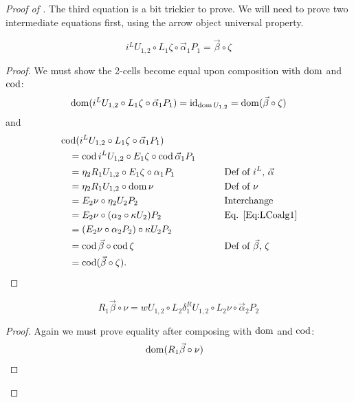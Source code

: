 \begin{proof}[Proof of ]
	The third equation is a bit trickier to prove. We will need to prove two intermediate equations first, using the arrow object universal property.
	\begin{lemma*}
		\begin{equation}\label{Eq:CompLem1}
			i^LU_{1,2} \circ L_1\zeta \circ \vec{\alpha}_1P_1 = \vec{\beta}\circ\zeta
		\end{equation}
	\end{lemma*}
	\begin{proof}
		We must show the 2-cells become equal upon composition with $\operatorname{dom}$ and $\operatorname{cod}$:
		\[
			\operatorname{dom}(i^LU_{1,2} \circ L_1\zeta \circ \vec{\alpha}_1P_1) = \operatorname{id}_{\operatorname{dom} U_{1,2}} = \operatorname{dom}(\vec{\beta}\circ\zeta)
		\]
		and
		\begin{alignat*}{2}
			\hspace{1em}&\hspace{-1em} \operatorname{cod}(i^L U_{1,2} \circ L_1\zeta \circ \vec{\alpha}_1P_1) && \\
			&= \operatorname{cod} i^LU_{1,2} \circ E_1\zeta \circ \operatorname{cod}\vec{\alpha}_1P_1 &\qquad& \\
			&= \eta_2R_1U_{1,2} \circ E_1\zeta \circ \alpha_1P_1 
				&& \text{Def of $i^L$, $\vec{\alpha}$} \\
			&= \eta_2R_1U_{1,2} \circ \operatorname{dom}\nu
				&& \text{Def of $\nu$} \\
			&= E_2\nu \circ \eta_2U_2P_2
				&& \text{Interchange} \\
			&= E_2\nu \circ (\alpha_2 \circ \kappa U_2)P_2
				&& \text{Eq. \eqref{Eq:LCoalg1}} \\
			&= (E_2\nu \circ \alpha_2P_2) \circ \kappa U_2P_2 && \\
			&= \operatorname{cod}\vec{\beta} \circ \operatorname{cod}\zeta
				&& \text{Def of $\vec{\beta}$, $\zeta$} \\
			&= \operatorname{cod}(\vec{\beta}\circ\zeta). &&
		\end{alignat*}
	\end{proof}
	\begin{lemma*}
		\begin{equation}\label{Eq:CompLem2}
			R_1\vec{\beta} \circ \nu = wU_{1,2} \circ L_2\delta_1^RU_{1,2} \circ L_2\nu \circ \vec{\alpha}_2P_2
		\end{equation}
	\end{lemma*}
	\begin{proof}
		Again we must prove equality after composing with $\operatorname{dom}$ and $\operatorname{cod}$:
		\begin{alignat*}{2}
			\hspace{1em}&\hspace{-1em} \dom(R_1\vec{\beta} \circ \nu) && \\

\end{alignat*}
\end{proof}
\end{proof}
